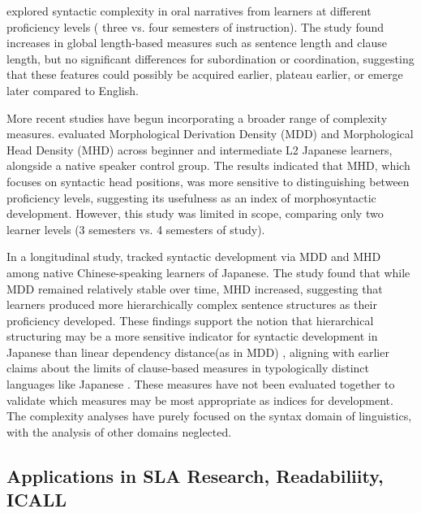 \cite{Iwashita2006} explored syntactic complexity in oral narratives from learners at different proficiency levels (
three vs. four semesters of instruction). The study found increases in global length-based measures such as sentence
length and clause length, but no significant differences for subordination or coordination, suggesting that these
features could possibly be acquired earlier, plateau earlier, or emerge later compared to English.

More recent studies have begun incorporating a broader range of complexity measures. \citet{komori2019} evaluated
Morphological Derivation Density (MDD) and Morphological Head Density (MHD) across beginner and intermediate L2
Japanese learners, alongside a native speaker control group. The results indicated that MHD, which focuses on
syntactic head positions, was more sensitive to distinguishing between proficiency levels, suggesting its usefulness
as an index of morphosyntactic development. However, this study was limited in scope, comparing only two learner
levels (3 semesters vs. 4 semesters of study).

In a longitudinal study, \citet{Yang2023} tracked syntactic development via MDD and MHD among native Chinese-speaking
learners of Japanese. The study found that while MDD remained relatively stable over time, MHD increased, suggesting
that learners produced more hierarchically complex sentence structures as their proficiency developed. These
findings support the notion that hierarchical structuring may be a more sensitive indicator for syntactic development
in Japanese than linear dependency distance(as in MDD) , aligning with earlier claims about the limits of
clause-based measures in typologically distinct languages like Japanese \citep{Iwashita2006}. These measures have
not been evaluated together to validate which measures may be most appropriate as indices for development. The
complexity analyses have purely focused on the syntax domain of linguistics, with the
analysis of other domains neglected.

\subsection{Applications in SLA Research, Readabiliity, ICALL}

